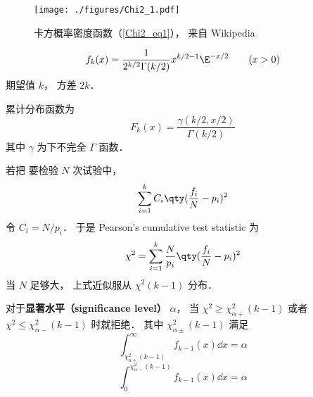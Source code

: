 
\begin{issues}
\issueDraft
\end{issues}

\begin{figure}[ht]
\centering
\texttt{[image: ./figures/Chi2\_1.pdf]}
\caption{卡方概率密度函数（\autoref{Chi2_eq1}）， 来自 Wikipedia} \label{Chi2_fig1}
\end{figure}

\begin{equation}\label{Chi2_eq1}
f_k(x) = \frac{1}{2^{k/2}\Gamma(k/2)}x^{k/2-1}\E^{-x/2} \qquad (x > 0)
\end{equation}
期望值 $k$， 方差 $2k$．

累计分布函数为
\begin{equation}
F_k(x) = \frac{\gamma(k/2, x/2)}{\Gamma(k/2)}
\end{equation}
其中 $\gamma$ 为下不完全 $\Gamma$ 函数．


若把 要检验 $N$ 次试验中， 
\begin{equation}
\sum_{i=1}^k C_i \qty(\frac{f_i}{N} - p_i)^2
\end{equation}
令 $C_i = N/p_i$． 于是 Pearson's cumulative test statistic 为
\begin{equation}
\chi^2 = \sum_{i=1}^k \frac{N}{p_i} \qty(\frac{f_i}{N} - p_i)^2
\end{equation}
当 $N$ 足够大， 上式近似服从 $\chi^2(k-1)$ 分布．

对于\textbf{显著水平（significance level）} $\alpha$， 当 $\chi^2 \geqslant \chi_{\alpha+}^2(k-1)$ 或者 $\chi^2 \leqslant \chi_{\alpha-}^2(k-1)$ 时就拒绝． 其中 $\chi_{\alpha\pm}^2(k-1)$ 满足
\begin{equation}
\int_{\chi_{\alpha+}^2(k-1)}^\infty f_{k-1}(x) \dd{x} = \alpha
\end{equation}
\begin{equation}
\int_0^{\chi_{\alpha-}^2(k-1)} f_{k-1}(x) \dd{x} = \alpha
\end{equation}

